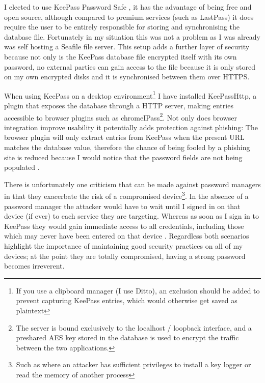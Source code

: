 \documentclass[11pt,a4paper]{scrartcl}
\begin{document}
\begin{refsection}
I elected to use KeePass Password Safe \cite{keepass_home}, it has the advantage of being free and open source, although compared to premium services (such as LastPass) it does require the user to be entirely responsible for storing and synchronising the database file. Fortunately in my situation this was not a problem as I was already was self hosting a Seafile file server. This setup adds a further layer of security because not only is the KeePass database file encrypted itself with its own password, no external parties can gain access to the file because it is only stored on my own encrypted disks and it is synchronised between them over HTTPS.

When using KeePass on a desktop environment\footnote{If you use a clipboard manager (I use Ditto), an exclusion should be added to prevent capturing KeePass entries, which would otherwise get saved as plaintext} 
I have installed KeePassHttp, a plugin that exposes the database through a HTTP server, making entries accessible to browser plugins such as chromeIPass\footnote{The server is bound exclusively to the localhost / loopback interface, and a preshared AES key stored in the database is used to encrypt the traffic between the two applications.}. Not only does browser integration improve usability it  potentially adds protection against phishing: The browser plugin will only extract entries from KeePass when the present URL matches the database value, therefore the chance of being fooled by a phishing site is reduced because I would notice that the password fields are not being populated \cite{ncsc_pass_managers}.

There is unfortunately one criticism that can be made against password managers in that they exacerbate the risk of a compromised device\footnote{Such as where an attacker has sufficient privileges to install a key logger or read the memory of another process}.
In the absence of a password manager the attacker would have to wait until I signed in on that device (if ever) to each service they are targeting. 
Whereas as soon as I sign in to KeePass they would gain immediate access to all credentials, including those which may never have been entered on that device \cite{citadel_keepass}. Regardless both scenarios highlight the importance of maintaining good security practices on all of my devices; at the point they are totally compromised, having a strong password becomes irreverent.

\printbibliography
\end{refsection}
\end{document}

